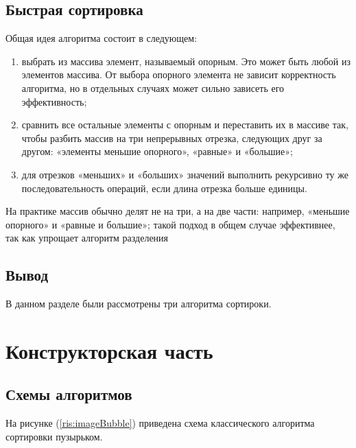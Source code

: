 \documentclass[12pt]{report}
\begin{document}
\section{Быстрая сортировка}
Общая идея алгоритма состоит в следующем:
\begin{enumerate}
    \item выбрать из массива элемент, называемый опорным. Это может быть любой из элементов массива. От выбора опорного элемента не зависит корректность алгоритма, но в отдельных случаях может сильно зависеть его эффективность;
	\item сравнить все остальные элементы с опорным и переставить их в массиве так, чтобы разбить массив на три непрерывных отрезка, следующих друг за другом: «элементы меньшие опорного», «равные» и «большие»;
	\item для отрезков «меньших» и «больших» значений выполнить рекурсивно ту же последовательность операций, если длина отрезка больше единицы.
\end{enumerate}
На практике массив обычно делят не на три, а на две части: например, «меньшие опорного» и «равные и большие»; такой подход в общем случае эффективнее, так как упрощает алгоритм разделения

\section{Вывод}
В данном разделе были рассмотрены три алгоритма сортироки.

\chapter{Конструкторская часть}
\section{Схемы алгоритмов}
На рисунке (\ref{ris:imageBubble}) приведена схема классического алгоритма сортировки пузырьком.
\end{document}
